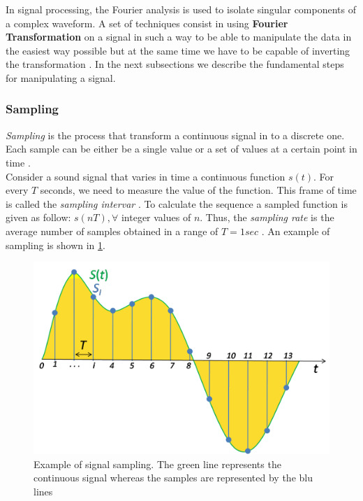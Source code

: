 \noindent In signal processing, the Fourier analysis is used to isolate singular components of a complex waveform. A set of techniques consist in using \textbf{Fourier Transformation} on a signal in such a way to be able to manipulate the data in the easiest way possible but at the same time we have to be capable of inverting the transformation \cite{fa_wiki} \cite{rabiner1975theory}. In the next subsections we describe the fundamental steps for manipulating a signal.

\subsubsection{Sampling}
\label{ssubs:sampling}
\textit{Sampling} is the process that transform a continuous signal in to a discrete one. Each sample can be either be a single value or a set of values at a certain point in time \cite{sampling_wiki}. \\ 
\noindent Consider a sound signal that varies in time a continuous function $s(t)$. For every $T$ seconds, we need to measure the value of the function. This frame of time is called the \textit{sampling intervar} \cite{weik2012communications}. To calculate the sequence a sampled function is given as follow: $s(nT), \forall$ integer values of $n$. Thus, the \textit{sampling rate} is the average number of samples obtained in a range of $T = 1sec$ \cite{sampling_wiki}. An example of sampling is shown in \ref{fig:sampling_ex}.

\begin{figure}[!ht]
	\centering
	\includegraphics[scale=0.2]{Figures/sampling_example.png}
	\caption{Example of signal sampling. The green line represents the continuous signal whereas the samples are represented by the blu lines \cite{sampling_wiki}}
	\label{fig:sampling_ex}
\end{figure}

